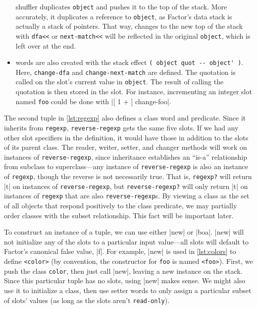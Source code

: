 \begin{itemize}
  shuffler duplicates \Verb|object| and pushes it to the top of the stack.
  More accurately, it duplicates a reference to \Verb|object|, as Factor's data
  stack is actually a stack of pointers.  That way, changes to the new top of
  the stack with \Verb|dfa<<| or \Verb|next-match<<| will be reflected in the
  original \Verb|object|, which is left over at the end.
%
  \item {} words are also created with the stack effect           %
  \Verb|( object quot -- object' )|.  Here, \Verb|change-dfa| and
  \Verb|change-next-match| are defined.  The quotation is called on the slot's
  current value in \Verb|object|.  The result of calling the quotation is then
  stored in the slot.  For instance, incrementing an integer slot named
  \Verb|foo| could be done with \factor|[ 1 + ] change-foo|.
\end{itemize}


The second tuple in \vref{lst:regexp} also defines a class word and predicate.
Since it inherits from \Verb|regexp|, \Verb|reverse-regexp| gets the same five
slots.  If we had any other slot specifiers in the definition, it would have
those in addition to the slots of its parent class.  The reader, writer,
setter, and changer methods will work on instances of \Verb|reverse-regexp|,
since inheritance establishes an ``is-a'' relationship from subclass to
superclass---any instance of \Verb|reverse-regexp| is also an instance of
\Verb|regexp|, though the reverse is not necessarily true.  That is,
\Verb|regexp?| will return \factor|t| on instances of \Verb|reverse-regexp|,
but \Verb|reverse-regexp?| will only return \factor|t| on instances of
\Verb|regexp| that are also \Verb|reverse-regexp|s.  By viewing a class as the
set of all objects that respond positively to the class predicate, we may
partially order classes with the subset relationship.  This fact will be
important later.

To construct an instance of a tuple, we can use either \factor|new| or
\factor|boa|.  \factor|new| will not initialize any of the slots to a
particular input value---all slots will default to Factor's canonical false
value, \factor|f|.  For example, \factor|new| is used in \vref{lst:colors} to
define \Verb|<color>| (by convention, the constructor for \Verb|foo| is named
\Verb|<foo>|).  First, we push the class \Verb|color|, then just call
\factor|new|, leaving a new instance on the stack.  Since this particular tuple
has no slots, using \factor|new| makes sense.  We might also use it to
initialize a class, then use setter words to only assign a particular subset of
slots' values (as long as the slots aren't \Verb|read-only|).

